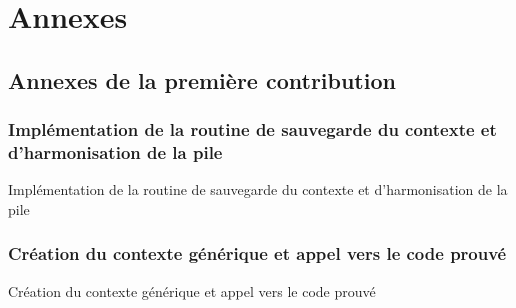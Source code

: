 \part{Annexes}

\chapter{Annexes de la première contribution}

\section{Implémentation de la routine de sauvegarde du contexte et d'harmonisation de la pile}

\begin{codeenv}
	\caption{Implémentation de la routine de sauvegarde du contexte et d'harmonisation de la pile}
	\label{code:cg_yieldGlue}
\end{codeenv}


\section{Création du contexte générique et appel vers le code prouvé}

\begin{codeenv}
	\caption{Création du contexte générique et appel vers le code prouvé}
	\label{code:yieldGlue}
\end{codeenv}

